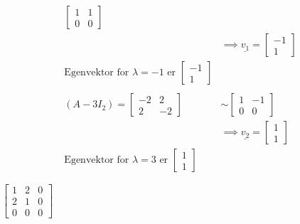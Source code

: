 \documentclass[11pt, a4paper, norsk]{NTNUoving}
\begin{document}
\begin{oppgave}
\begin{punkt}
\begin{align*}
\begin{bmatrix}
                    1 & 1 \\
                    0 & 0
                \end{bmatrix}
                \\
                &\implies \underline{v_1} = \begin{bmatrix}
                    -1 \\
                    1
                \end{bmatrix}
                \\
                \text{Egenvektor for } \lambda = -1 \text{ er } \begin{bmatrix}
                    -1 \\
                    1
                \end{bmatrix}
                \\
                \\
                (A - 3I_2) = \begin{bmatrix}
                    -2 & 2 \\
                    2 & -2
                \end{bmatrix} &\sim \begin{bmatrix}
                1 & -1 \\
                0 & 0
                \end{bmatrix}
                \\
                &\implies \underline{v_2} = \begin{bmatrix}
                    1 \\
                    1
                \end{bmatrix}
                \\
                 \text{Egenvektor for } \lambda = 3 \text{ er } \begin{bmatrix}
                    1 \\
                    1
                \end{bmatrix}
            \end{align*}
        \end{punkt}
        \begin{punkt}
            $\begin{bmatrix}
                1 & 2 & 0 \\
                2 & 1 & 0 \\
                0 & 0 & 0
            \end{bmatrix}$


\end{punkt}
\end{oppgave}
\end{document}
